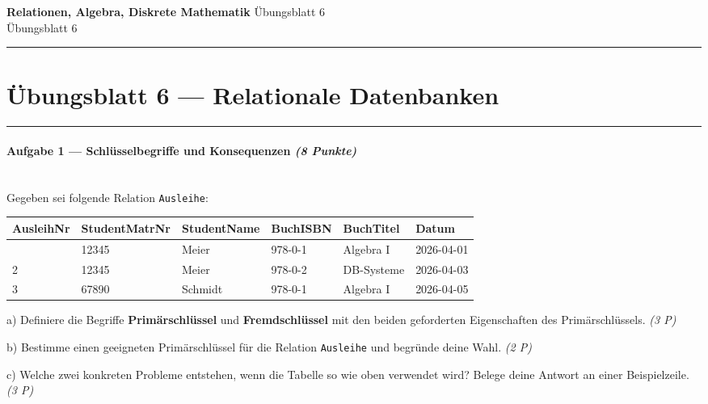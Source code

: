 \documentclass[11pt, a4paper]{article}
\providecommand{\nichttitle}{Übungsblatt}
\providecommand{\nichtsubtitle}{}
\renewcommand{\nichttitle}{Relationen, Algebra, Diskrete Mathematik}
\renewcommand{\nichtsubtitle}{Übungsblatt 6}
\begin{document}
\begin{center}
{\Large\bfseries\color{accent}\nichttitle}
\ifx\nichtsubtitle\empty\else
  \\[2pt]{\normalsize\color{accent!80!black}\nichtsubtitle}
\fi
\\[2pt]
\color{accent}\rule{0.4\linewidth}{0.8pt}\color{black}
\end{center}
\vspace{4pt}


\section{Übungsblatt 6 — Relationale Datenbanken}


\noindent\textcolor{rulegray}{\rule{\linewidth}{0.4pt}}


\paragraph{Aufgabe 1 — Schlüsselbegriffe und Konsequenzen \textit{(8 Punkte)}}\mbox{}\\[2pt]

Gegeben sei folgende Relation \texttt{Ausleihe}:



{\small
\begin{tabularx}{\linewidth}{XXXXXX}
\hline
\rowcolor{tableheadbg}
{\color{white}\textbf{AusleihNr}} & {\color{white}\textbf{StudentMatrNr}} & {\color{white}\textbf{StudentName}} & {\color{white}\textbf{BuchISBN}} & {\color{white}\textbf{BuchTitel}} & {\color{white}\textbf{Datum}} \\[2pt]
\hline
\endhead
\hline
\endfoot
1 & 12345 & Meier & 978-0-1 & Algebra I & 2026-04-01 \\
2 & 12345 & Meier & 978-0-2 & DB-Systeme & 2026-04-03 \\
3 & 67890 & Schmidt & 978-0-1 & Algebra I & 2026-04-05 \\
\end{tabularx}
}


a) Definiere die Begriffe \textbf{Primärschlüssel} und \textbf{Fremdschlüssel} mit den beiden geforderten Eigenschaften des Primärschlüssels. \textit{(3 P)}

b) Bestimme einen geeigneten Primärschlüssel für die Relation \texttt{Ausleihe} und begründe deine Wahl. \textit{(2 P)}

c) Welche zwei konkreten Probleme entstehen, wenn die Tabelle so wie oben verwendet wird? Belege deine Antwort an einer Beispielzeile. \textit{(3 P)}
\end{document}
